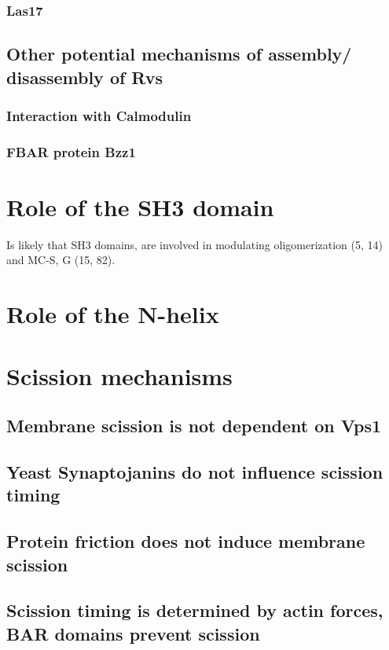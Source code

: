 		\subsubsection{Las17}


	\subsection{Other potential mechanisms of assembly/ disassembly of Rvs}		
			\subsubsection{Interaction with Calmodulin}
			\subsubsection{FBAR protein Bzz1}
				
\section{Role of the SH3 domain}	
Is likely that SH3 domains, are involved in modulating oligomerization (5, 14) and MC-S, G (15, 82). 	
\section{Role of the N-helix}			
		
\section{Scission mechanisms}

	\subsection{Membrane scission is not dependent on Vps1}
	\subsection{Yeast Synaptojanins do not influence scission timing}
	\subsection{Protein friction does not induce membrane scission }
	\subsection{Scission timing is determined by actin forces, \\
		BAR domains prevent scission}
